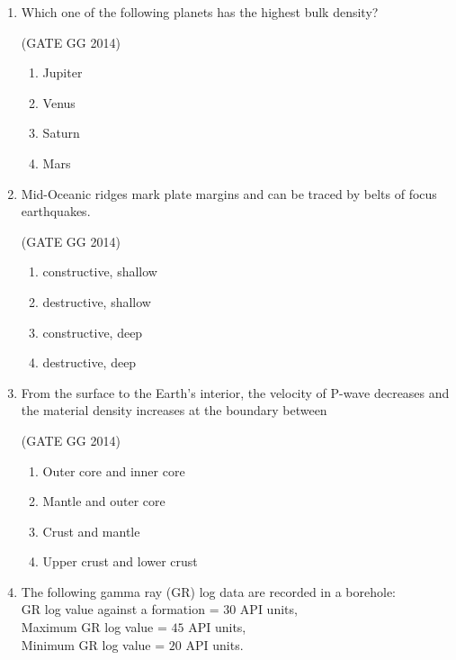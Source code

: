 \documentclass[journal]{IEEEtran}
\begin{document}
\begin{enumerate}[start=1]
\item Which one of the following planets has the highest bulk density?

\hfill{(GATE GG 2014)}\\
\begin{multicols}{4}
    \begin{enumerate}
    \item  Jupiter
\item  Venus
\item  Saturn
\item  Mars
\end{enumerate}
\end{multicols}



\item Mid-Oceanic ridges mark plate margins and can be traced by belts of focus earthquakes.

\hfill{(GATE GG 2014)}\\
\begin{multicols}{2}
    \begin{enumerate}
    \item  constructive, shallow
\item  destructive, shallow
\item  constructive, deep
\item  destructive, deep
\end{enumerate}
\end{multicols}


\item  From the surface to the Earth's interior, the velocity of P-wave decreases and the material density increases at the boundary between

\hfill{(GATE GG 2014)}\\
\begin{enumerate}
    \item  Outer core and inner core
\item  Mantle and outer core
\item  Crust and mantle
\item  Upper crust and lower crust
\end{enumerate}


\item The following gamma ray (GR) log data are recorded in a borehole:\\
GR log value against a formation = $30$ API units,\\
Maximum GR log value = $45$ API units,\\
Minimum GR log value = $20$ API units.\\


\end{enumerate}
\end{document}
